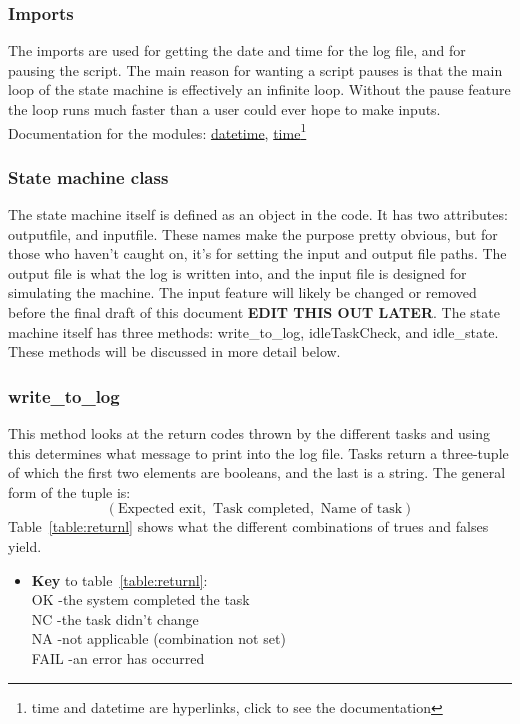 \documentclass[titlepage]{article}
\begin{document}
\subsubsection{Imports}
\label{section:imports_sm}
The imports are used for getting the date and time for the log file, and for pausing the script. The main reason for wanting a script pauses is that the main loop of the state machine is effectively an infinite loop. Without the pause feature the loop runs much faster than a user could ever hope to make inputs. Documentation for the modules: \href{https://docs.python.org/3/library/datetime.html}{datetime}, 
\href{https://docs.python.org/3/library/time.html}{time}\footnote{time and datetime are hyperlinks, click to see the documentation}\\

\subsubsection{State machine class}
The state machine itself is defined as an object in the code. It has two attributes: outputfile, and inputfile. These names make the purpose pretty obvious, but for those who haven't caught on, it's for setting the input and output file paths. The output file is what the log is written into, and the input file is designed for simulating the machine. The input feature will likely be changed or removed before the final draft of this document \textbf{ EDIT THIS OUT LATER}. The state machine itself has three methods: write\_to\_log, idleTaskCheck, and idle\_state. These methods will be discussed in more detail below.

\subsubsection{write\_to\_log}
\label{section:logwrite}
This method looks at the return codes thrown by the different tasks and using this determines what message to print into the log file. Tasks return a three-tuple of which the first two elements are booleans, and the last is a string. The general form of the tuple is:\\
$$\left(\text{Expected exit}, \text{ Task completed},\text{ Name of task}\right)$$
Table~\ref{table:returnl} shows what the different combinations of trues and falses yield. 

\begin{itemize}
    \item \textbf{Key} to table~\ref{table:returnl}:\\
    OK -the system completed the task\\
    NC -the task didn't change\\
    NA -not applicable (combination not set)\\
    FAIL -an error has occurred\\
\end{itemize}
\end{document}
